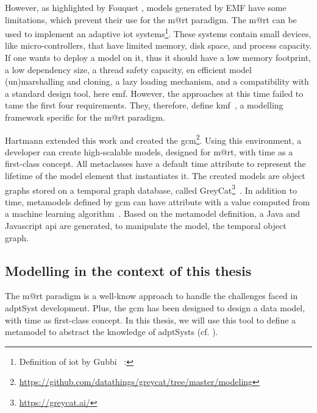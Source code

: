 However, as highlighted by Fouquet \etal \cite{DBLP:journals/corr/FrancoisNMDBPJ14, DBLP:conf/models/FouquetNMDBPJ12}, models generated by EMF have some limitations, which prevent their use for the \gls{m@rt} paradigm.
The \gls{m@rt} can be used to implement an adaptive \gls{iot} systems\footnote{Definition of \gls{iot} by Gubbi \etal~\cite{DBLP:journals/fgcs/GubbiBMP13}: }.
These systems contain small devices, like micro-controllers, that have limited memory, disk space, and process capacity.
If one wants to deploy a model on it, thus it should have a low memory footprint, a low dependency size, a thread safety capacity, en efficient model (un)marshalling and cloning, a lazy loading mechanism, and a compatibility with a standard design tool, here \gls{emf}.
However, the approaches at this time failed to tame the first four requirements.
They, therefore, define \gls{kmf}~\cite{DBLP:journals/corr/FrancoisNMDBPJ14, DBLP:conf/models/FouquetNMDBPJ12}, a modelling framework specific for the \gls{m@rt} paradigm.

Hartmann extended this work and created the \gls{gcm}\footnote{\url{https://github.com/datathings/greycat/tree/master/modeling}}.
Using this environment, a developer can create high-scalable models, designed for \gls{m@rt}\cite{DBLP:conf/seke/0001FNMKT14, DBLP:conf/models/Moawad0FNKT15}, with time as a first-class concept.
All metaclasses have a default time attribute to represent the lifetime of the model element that instantiates it.
The created models are object graphs stored on a temporal graph database, called GreyCat\footnote{\url{https://greycat.ai/}}~\cite{DBLP:journals/is/HartmannFMRT19, DBLP:phd/basesearch/Hartmann16}.
In addition to time, \glspl{metamodel} defined by \gls{gcm} can have attribute with a value computed from a machine learning algorithm~\cite{DBLP:journals/sosym/0001MFT19}.
Based on the \gls{metamodel} definition, a Java and Javascript \gls{api} are generated, to manipulate the model, \ie the temporal object graph.


\subsection{Modelling in the context of this thesis}
The \gls{m@rt} paradigm is a well-know approach to handle the challenges faced in \gls{adptSyst} development.
Plus, the \gls{gcm} has been designed to design a data model, with time as first-class concept.
In this thesis, we will use this tool to define a \gls{metamodel} to abstract the knowledge of \glspl{adptSyst} (cf. ).

